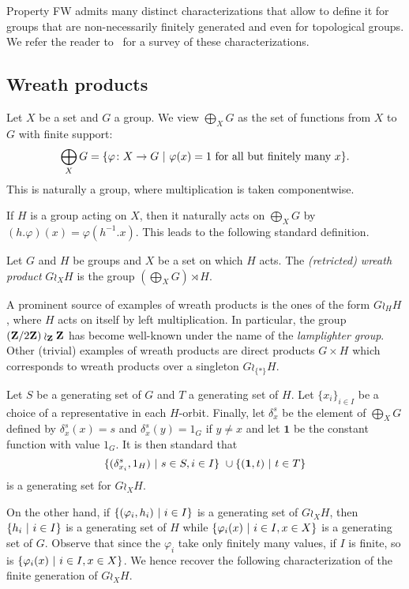 Property FW admits many distinct characterizations that allow to define it for groups that are non-necessarily finitely generated and even for topological groups. We refer the reader to~\cite{Cornulier2013} for a survey of these characterizations.
%
%
%
%
%
%
%
%
%
%
\subsection{Wreath products}
%
%
%
%
%
Let $X$ be a set and $G$ a group. We view
$\bigoplus_XG$ as the set of functions from $X$ to $G$ with finite support:
\[
	\bigoplus_XG=\{\varphi\colon X\to G\ |\ \varphi(x)=1 \textnormal{ for all but finitely many }x\}.
\]
This is naturally a group, where multiplication is taken componentwise.

If $H$ is a group acting on $X$, then it naturally acts on $\bigoplus_XG$
by $(h.\varphi)(x)=\varphi(h^{-1}.x)$.
This leads to the following standard definition.
\begin{defn}\label{Def:WreathProd}
Let $G$ and $H$ be groups and $X$ be a set on which $H$ acts.
The \emph{(retricted) wreath product} $G\wr_XH$ is the group $(\bigoplus_XG)\rtimes H$.
\end{defn}
A prominent  source of examples of wreath products is the ones of the form $G\wr_HH$, where $H$ acts on itself by left multiplication.
In particular, the group $(\mathbf{Z}/2\mathbf{Z})\wr_{\mathbf{Z}}\mathbf{Z}$ has become well-known under the name of the \emph{lamplighter group}.
Other (trivial) examples of wreath products are direct products $G\times H$ which corresponds to wreath products over a singleton $G\wr_{\{*\}}H$.

Let $S$ be a generating set of $G$ and $T$ a generating set of $H$.
Let $\{x_i\}_{i\in I}$ be a choice of a representative in each $H$-orbit.
Finally, let $\delta_x^s$ be the element of $\bigoplus_XG$ defined by $\delta_x^s(x)=s$ and $\delta_x^s(y)=1_G$ if $y\neq x$ and let $\mathbf 1$ be the constant function with value $1_G$.
It is then standard that
\[
	\setst{(\delta_{x_i}^s,1_H)}{s \in S,i\in I} \cup \setst{(\mathbf 1,t)}{t \in T}
\]
is a generating set for $G\wr_XH$.

On the other hand, if $\{(\varphi_i,h_i)\ |\ i\in I\}$ is a generating set of $G\wr_XH$, then $\{h_i\ |\ i\in I\}$ is a generating set of $H$ while $\{\varphi_i(x)\ |\ i\in I,x\in X\}$ is a generating set of $G$.
Observe that since the $\varphi_i$ take only finitely many values, if $I$ is finite, so is $\{\varphi_i(x)\ |\ i\in I,x\in X\}$.
We hence recover the following characterization of the finite generation of $G\wr_XH$.

